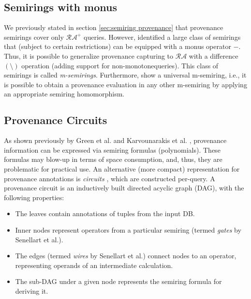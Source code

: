 \subsection{Semirings with monus} We previously stated in section \ref{sec:semiring provenance} that provenance semirings cover only $\mathcal{RA^+}$ queries. However, \cite{monus_k_relations} identified a large class of semirings that (subject to certain restrictions) can be equipped with a monus operator $-$. Thus, it is possible to generalize provenance capturing to $\mathcal{RA}$ with a difference $(\setminus)$ operation (adding support for non-monotone\footnotemark queries). 
This class of semirings is called \textit{m-semirings}. Furthermore, \cite{monus_k_relations} show a universal m-semiring, i.e., it is possible to obtain a provenance evaluation in any other m-semiring by applying an appropriate semiring homomorphism.
\subsection{Provenance Circuits}\label{sec:provenance circuits}
As shown previously by Green et al. \cite{green2007provenance} and Karvounarakis et al. \cite{Karvounarakis:2012:SDQ:2380776.2380778}, provenance information can be expressed via semiring formulas (polynomials). These formulas may blow-up in terms of space consumption, and, thus, they are problematic for practical use. An alternative (more compact) representation for provenance annotations is  \textit{circuits} \cite{Deutch2014, Senellart2017}, which are constructed per-query. A provenance circuit is an inductively built directed acyclic graph (DAG), with the following properties:
\begin{itemize}
    \item The leaves contain annotations of tuples from the input DB.
    \item Inner nodes represent operators from a particular semiring (termed \textit{gates} by Senellart et al.). 
    \item The edges (termed \textit{wires} by Senellart et al.) connect nodes to an operator, representing operands of an intermediate calculation.
    \item The sub-DAG under a given node represents the semiring formula for deriving it. 
\end{itemize}
